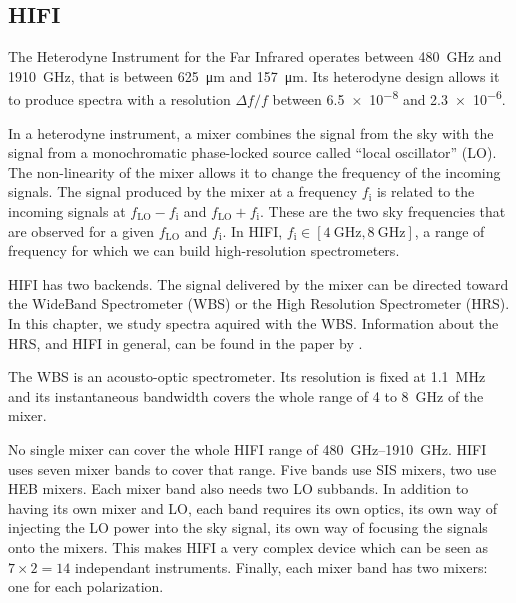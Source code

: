 \subsection{HIFI}

The Heterodyne Instrument for the Far Infrared operates between \SI{480}{\giga\hertz} and \SI{1910}{\giga\hertz}, that is between \SI{625}{\micro\meter} and \SI{157}{\micro\meter}.
Its heterodyne design allows it to produce spectra with a resolution $\Delta f/ f$ between \num{6.5e-8} and \num{2.3e-6}.

In a heterodyne instrument, a mixer combines the signal from the sky with the signal from a monochromatic phase-locked source called ``local oscillator'' (LO).
The non-linearity of the mixer allows it to change the frequency of the incoming signals.
The signal produced by the mixer at a frequency $f_\text{i}$ is related to the incoming signals at $f_\text{LO}-f_\text{i}$ and $f_\text{LO}+f_\text{i}$.
These are the two sky frequencies that are observed for a given $f_\text{LO}$ and $f_\text{i}$.
In HIFI, $f_\text{i} \in [\SI{4}{\giga\hertz}, \SI{8}{\giga\hertz}]$, a range of frequency for which we can build high-resolution spectrometers.

HIFI has two backends.
The signal delivered by the mixer can be directed toward the WideBand Spectrometer (WBS) or the High Resolution Spectrometer (HRS).
In this chapter, we study spectra aquired with the WBS.
Information about the HRS, and HIFI in general, can be found in the paper by \citeauthor{AA_518_L6} \cite{AA_518_L6}.

The WBS is an acousto-optic spectrometer.
Its resolution is fixed at \SI{1.1}{\mega\hertz} and its instantaneous bandwidth covers the whole range of 4 to \SI{8}{\giga\hertz} of the mixer.

No single mixer  can cover the whole HIFI range of \SIrange{480}{1910}{\giga\hertz}.
HIFI uses seven mixer bands to cover that range.
Five bands use SIS mixers, two use HEB mixers.
Each mixer band also needs two LO subbands.
In addition to having its own mixer and LO, each band requires its own optics, its own way of injecting the LO power into the sky signal, its own way of focusing the signals onto the mixers.
This makes HIFI a very complex device which can be seen as $7 \times 2 =14$ independant instruments.
Finally, each mixer band has two mixers: one for each polarization.









